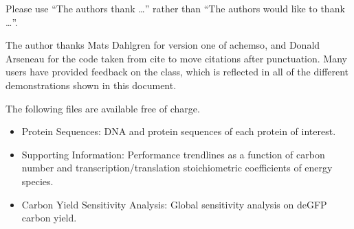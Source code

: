 \documentclass[journal=asbcd6,manuscript=article]{achemso}
\begin{document}
\begin{acknowledgement}

Please use ``The authors thank \ldots'' rather than ``The
authors would like to thank \ldots''.

The author thanks Mats Dahlgren for version one of \textsf{achemso},
and Donald Arseneau for the code taken from \textsf{cite} to move
citations after punctuation. Many users have provided feedback on the
class, which is reflected in all of the different demonstrations
shown in this document.

\end{acknowledgement}

\begin{suppinfo}
The following files are available free of charge.
\begin{itemize}
  \item Protein Sequences: DNA and protein sequences of each protein of interest.
  \item Supporting Information: Performance trendlines as a function of carbon number and transcription/translation stoichiometric coefficients of energy species.
  \item Carbon Yield Sensitivity Analysis: Global sensitivity analysis on deGFP carbon yield.
\end{itemize}
\end{suppinfo}

\clearpage


\end{document}
